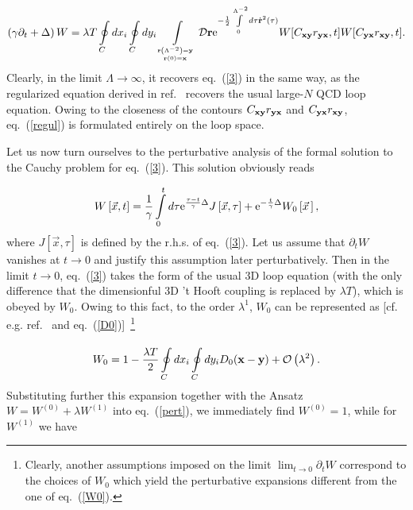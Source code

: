 \documentclass[a4paper,12pt]{article}
\begin{document}
\begin{equation}
\label{regul}
\left(\gamma\partial_t+\Delta\right)W=\lambda T\oint\limits_{C}^{}dx_i\oint\limits_{C}^{}dy_i
\int\limits_{{{\bf r}\left(\Lambda^{-2}\right)={\bf y}}\atop
{{\bf r}(0)={\bf x}}}^{}
{\cal D}{\bf r}
{\rm e}^{-\frac12\int\limits_{0}^{\Lambda^{-2}}d\tau\dot{\bf r}^2(\tau)}
W[C_{\bf xy}r_{\bf yx},t]W[C_{\bf yx}r_{\bf xy},t].
\end{equation}
Clearly, in the limit $\Lambda\to\infty$, it recovers eq.~(\ref{3}) in the same way, as the regularized equation
derived in ref.~\cite{mh} recovers the usual large-$N$ QCD loop equation. Owing to the closeness of the contours
$C_{\bf xy}r_{\bf yx}$ and $C_{\bf yx}r_{\bf xy}$, eq.~(\ref{regul}) is formulated entirely on the loop space.


Let us now turn ourselves to the perturbative analysis of the formal solution to the Cauchy problem for eq.~(\ref{3}).
This solution obviously reads

\begin{equation}
\label{pert}
W\left[\vec x,t\right]=\frac{1}{\gamma}\int\limits_{0}^{t}d\tau{\rm e}^{\frac{\tau-t}{\gamma}\Delta}J\left[\vec x,\tau\right]+
{\rm e}^{-\frac{t}{\gamma}\Delta}W_0\left[\vec x{\,}\right],
\end{equation}
where $J\left[\vec x,\tau\right]$ is defined by the r.h.s. of eq.~(\ref{3}).
Let us assume that $\partial_tW$ vanishes at $t\to 0$ and justify this assumption later perturbatively.
Then in the limit $t\to 0$, eq.~(\ref{3}) takes the form of the usual 3D loop equation (with the only difference that the
dimensionful 3D 't Hooft coupling is replaced by $\lambda T$), which is obeyed by $W_0$. Owing to this fact, to the order $\lambda^1$,
$W_0$ can be represented as [cf. e.g. ref.~\cite{rev} and eq.~(\ref{D0})]~\footnote{Clearly, another assumptions imposed on the
limit $\lim_{t\to 0}^{}\partial_tW$ correspond to the choices of $W_0$ which
yield the perturbative expansions different from the one of eq.~(\ref{W0}).}

\begin{equation}
\label{W0}
W_0=1-\frac{\lambda T}{2}\oint\limits_{C}^{}dx_i\oint\limits_{C}^{}dy_iD_0({\bf x}-{\bf y})+{\cal O}\left(\lambda^2\right).
\end{equation}
Substituting further this expansion
together with the Ansatz $W=W^{(0)}+\lambda W^{(1)}$ into eq.~(\ref{pert}), we immediately find $W^{(0)}=1$,
while for $W^{(1)}$ we have
\end{document}
